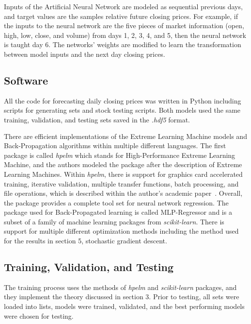 \documentclass{ncjms}
\begin{document}
	Inputs of the Artificial Neural Network are modeled as sequential previous days, and target values are the samples relative future closing prices.
	For example, if the inputs to the neural network are the five pieces of market information (open, high, low, close, and volume) from days 1, 2, 3, 4, and 5, then the neural network is taught day 6.
	The networks' weights are modified to learn the transformation between model inputs and the next day closing prices.

	\subsection{Software}\label{subsec:software}
	All the code for forecasting daily closing prices was written in Python including scripts for generating sets and stock testing scripts.
	Both models used the same training, validation, and testing sets saved in the \textit{.hdf5} format.

	There are efficient implementations of the Extreme Learning Machine models and Back-Propagation algorithms within multiple different languages.
	The first package is called \textit{hpelm} which stands for High-Performance Extreme Learning Machine, and the authors modeled the package after the description of Extreme Learning Machines.
	Within \textit{hpelm}, there is support for graphics card accelerated training, iterative validation, multiple transfer functions, batch processing, and file operations, which is described within the author's academic paper~\citep{Akusok:2015}.
	Overall, the package provides a complete tool set for neural network regression.
	The package used for Back-Propagated learning is called MLP-Regressor and is a subset of a family of machine learning packages from \textit{scikit-learn}.
	There is support for multiple different optimization methods including the method used for the results in section 5, stochastic gradient descent.

	\subsection{Training, Validation, and Testing}\label{subsec:training-validation-and-testing}
	The training process uses the methods of \textit{hpelm} and \textit{scikit-learn} packages, and they implement the theory discussed in section 3.
	Prior to testing, all sets were loaded into lists, models were trained, validated, and the best performing models were chosen for testing.
\end{document}
